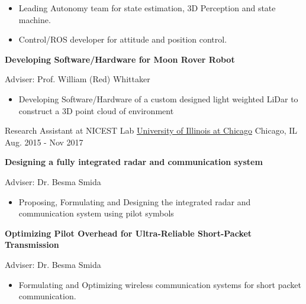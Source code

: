 \begin{cventries}
{\begin{cvitems}
		\begin{itemize}
			\item Leading Autonomy team  for state estimation, 3D Perception and state machine.
			\item Control/ROS developer for attitude and position control.
		\end{itemize}
		\item \textbf{Developing Software/Hardware for Moon Rover Robot} \begin{flushright} {\color{awesome} Adviser: Prof. William (Red) Whittaker} \end{flushright}
		\begin{itemize}
			\item Developing Software/Hardware of a custom designed light weighted LiDar to construct a 3D point cloud of environment
		\end{itemize}
      \end{cvitems}
    }






  \cventry
    {Research Assistant at NICEST Lab} %
    {\href{http://www.uic.edu}{University of Illinois at Chicago}} %
    {Chicago, IL} %
    {Aug. 2015 - Nov 2017} %
    {
      \begin{cvitems} %
		\item \textbf{Designing a fully integrated radar and communication system} \begin{flushright} {\color{awesome} Adviser: Dr. Besma Smida} \end{flushright}
		\begin{itemize}
				\item Proposing, Formulating and Designing the integrated radar and communication system using pilot symbols
		\end{itemize}
		\item \textbf{Optimizing Pilot Overhead for Ultra-Reliable Short-Packet Transmission} \begin{flushright} {\color{awesome} Adviser: Dr. Besma Smida} \end{flushright}
		\begin{itemize}
				\item Formulating and Optimizing wireless communication systems for short packet communication.
		\end{itemize}				      
      \end{cvitems}
    }






\end{cventries}
